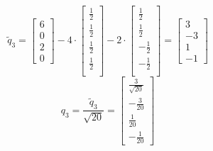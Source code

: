 \documentclass{article}
\begin{document}
\[
    \tilde{q}_3 = \begin{bmatrix}
        6 \\ 0 \\ 2 \\ 0
    \end{bmatrix}
    - 4 \cdot \begin{bmatrix} 
        \frac{1}{2} \\ \frac{1}{2} \\ \frac{1}{2} \\ \frac{1}{2} \\
    \end{bmatrix}
    - 2 \cdot \begin{bmatrix} 
        \frac{1}{2} \\ \frac{1}{2} \\ -\frac{1}{2} \\ -\frac{1}{2} \\
    \end{bmatrix} = \begin{bmatrix}
        3 \\ -3 \\ 1 \\ -1
    \end{bmatrix}
\]
\[
    q_3 = \frac{\tilde{q}_3}{\sqrt{20}} = \begin{bmatrix}
        \frac{3}{\sqrt{20}} \\ -\frac{3}{20} \\ \frac{1}{20} \\ -\frac{1}{20}
    \end{bmatrix}
\]
\newpage 
\end{document}
